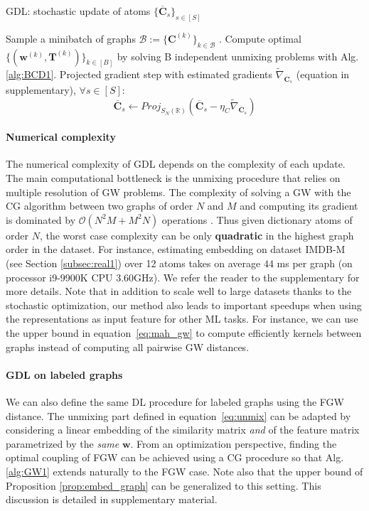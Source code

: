\documentclass{article}
\def\eqref#1{equation~\ref{#1}}
\def\vw{{\bm{w}}}
\def\mC{{\bm{C}}}
\def\mT{{\bm{T}}}
\newcommand{\R}{\mathbb{R}}
\def\R{{\mathbb{R}}}
\begin{document}
	\begin{algorithm}[t]
		\caption{GDL: stochastic update of atoms $\{\overline{\mC}_s\}_{s\in [S]}$}
		\label{alg:GW1}
		\begin{algorithmic}[1]
			\STATE Sample a minibatch of graphs $\mathcal{B} :=\{\mC^{(k)}\}_{k \in \mathcal{B}}$ .
			\STATE Compute optimal $\{(\vw^{(k)},\mT^{(k)})\}_{k \in [B]}$ by solving B independent unmixing problems with Alg.\ref{alg:BCD1}. 
			\STATE Projected gradient step with estimated gradients $\widetilde{\nabla}_{\overline{\mC}_s}$ (equation in supplementary), $\forall s \in [S]$: \vspace{-2mm}
			\begin{equation}
			\overline{\mC}_s \leftarrow Proj_{S_N(\R)}( \overline{\mC}_s - \eta_C \widetilde{\nabla}_{\overline{\mC}_s} )
			\end{equation}
		\end{algorithmic}
	\end{algorithm}
	
	\paragraph{Numerical complexity} The numerical complexity of GDL depends on the complexity of each update. The main computational bottleneck is the unmixing procedure that relies on multiple resolution of GW
	problems. The complexity of solving a GW with the {CG} algorithm between two graphs of order $N$ and $M$ and computing
	its gradient is dominated by  $\mathcal{O}\left(N^2
	M+M^2N\right)$ operations
	\cite{peyre2016gromov,vayer-fused-2018}.
	Thus given dictionary
	atoms of order $N$, the worst case complexity 
	can be only \textbf{quadratic} in
	the highest graph order in the dataset.  For instance, estimating embedding on dataset IMDB-M (see Section \ref{subsec:real1}) over 12 atoms takes on average $44$ ms per graph (on processor i9-9900K CPU 3.60GHz). {We refer the reader to the
		supplementary for more details.}
	Note that in addition to scale well to large datasets thanks to the stochastic
	optimization, our method also leads to important speedups when using the
	representations as input feature for other ML tasks. For instance, we can use the upper bound in
	\eqref{eq:mah_gw} to compute efficiently kernels between graphs instead of
	computing all pairwise GW distances.
	\paragraph{GDL on labeled graphs}{We can also define the same DL procedure for labeled graphs using the FGW distance. The unmixing part defined in \eqref{eq:unmix} can be adapted by considering a linear embedding of the similarity matrix \emph{and} of the feature matrix parametrized by the \emph{same} $\vw$. From an optimization perspective, finding the optimal coupling of FGW can be achieved  using a CG procedure so that Alg.\ref{alg:GW1} extends naturally to the FGW case. Note also that the upper bound
		of Proposition \ref{prop:embed_graph} can be generalized to this setting. This discussion is
		detailed in supplementary material.}
	
\end{document}
